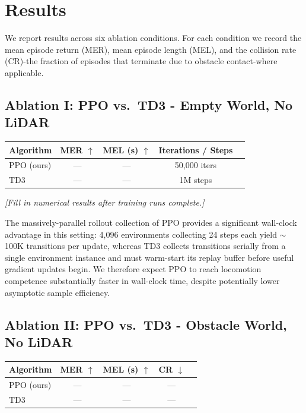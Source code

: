 \documentclass{article}
\begin{document}
\section{Results}

We report results across six ablation conditions.
For each condition we record the mean episode return (MER), mean episode
length (MEL), and the collision rate (CR)-the fraction of episodes that
terminate due to obstacle contact-where applicable.

\subsection{Ablation I: PPO vs.\ TD3 - Empty World, No LiDAR}

\begin{center}
\begin{tabular}{lcccc}
  \toprule
  \textbf{Algorithm} & \textbf{MER} $\uparrow$ & \textbf{MEL (s)} $\uparrow$
    & \textbf{Iterations / Steps} \\
  \midrule
  PPO (ours) & --- & --- & 50{,}000 iters \\
  TD3         & --- & --- & 1M steps \\
  \bottomrule
\end{tabular}
\end{center}

\textit{[Fill in numerical results after training runs complete.]}

The massively-parallel rollout collection of PPO provides a significant
wall-clock advantage in this setting: 4{,}096 environments collecting 24
steps each yield $\sim$100K transitions per update, whereas TD3 collects
transitions serially from a single environment instance and must warm-start
its replay buffer before useful gradient updates begin.
We therefore expect PPO to reach locomotion competence substantially faster
in wall-clock time, despite potentially lower asymptotic sample efficiency.

\subsection{Ablation II: PPO vs.\ TD3 - Obstacle World, No LiDAR}

\begin{center}
\begin{tabular}{lcccc}
  \toprule
  \textbf{Algorithm} & \textbf{MER} $\uparrow$ & \textbf{MEL (s)} $\uparrow$
    & \textbf{CR} $\downarrow$ \\
  \midrule
  PPO (ours) & --- & --- & --- \\
  TD3         & --- & --- & --- \\
  \bottomrule
\end{tabular}
\end{center}
\end{document}
